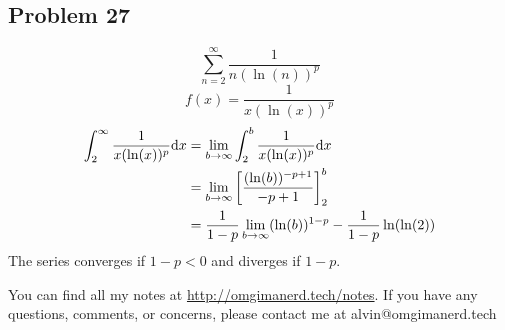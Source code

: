 \documentclass[letterpaper, 12pt]{math}
\begin{document}
\subsection*{Problem 27}
\[ \sum_{n=2}^{\infty}\frac{1}{n(\ln(n))^{p}} \]
\[ f(x) = \frac{1}{x(\ln(x))^{p}} \]
\begin{align*}
  \int_{2}^{\infty}\frac{1}{x(\ln(x))^{p}}\mathrm{d}{x} &=
    \lim_{b\to\infty}\int_{2}^{b}\frac{1}{x(\ln(x))^{p}}\mathrm{d}{x} \\
  &= \lim_{b\to\infty}\bigg[\frac{(\ln(b))^{-p+1}}{-p+1}\bigg]_{2}^{b} \\
  &= \frac{1}{1-p}\lim_{b\to\infty}(\ln(b))^{1-p}-\frac{1}{1-p}\ln(\ln(2)) \\
\end{align*}
The series converges if \( 1-p < 0 \) and diverges if \( 1 - p \).

\begin{center}
  You can find all my notes at \url{http://omgimanerd.tech/notes}. If you have
  any questions, comments, or concerns, please contact me at
  alvin@omgimanerd.tech
\end{center}
\end{document}
